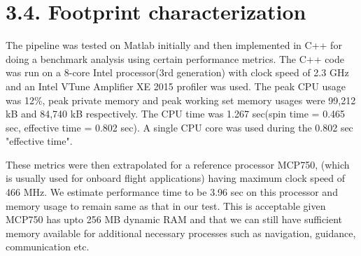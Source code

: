 \documentclass{article}
\title{}
\author{}
\date{\vspace{-5ex}}
\begin{document}
	\maketitle
	
	\section*{3.4. Footprint characterization}
The pipeline was tested on Matlab initially and then implemented in C++ for doing a benchmark analysis using certain performance metrics. The C++ code was run on a 8-core Intel processor(3rd generation) with clock speed of 2.3 GHz and an Intel VTune Amplifier XE 2015 profiler was used. The peak CPU usage was 12\%, peak private memory and peak working set memory usages were 99,212 kB and 84,740 kB respectively. The CPU time was 1.267 sec(spin time = 0.465 sec, effective time = 0.802 sec). A single CPU core was used during the 0.802 sec "effective time". \newline

These metrics were then extrapolated for a reference processor MCP750, (which is usually used for onboard flight applications)  having maximum clock speed of 466 MHz. We estimate performance time to be 3.96 sec on this processor and memory usage to remain same as that in our test. This is acceptable given MCP750 has upto 256 MB dynamic RAM and that we can still have sufficient memory available for additional necessary processes such as navigation, guidance, communication etc.


	
\end{document}
